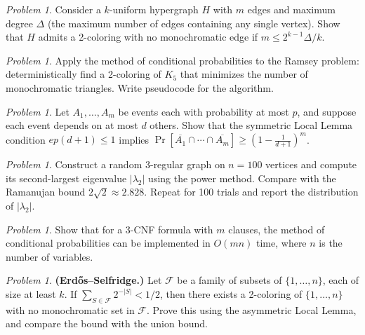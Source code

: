 \documentclass[twoside,12pt]{book}
\theoremstyle{plain}
\theoremstyle{definition}
\theoremstyle{remark}
\newtheorem{problem}[theorem]{Problem}
\begin{document}
\begin{problem}
Consider a $k$-uniform hypergraph $H$ with $m$ edges and maximum degree
$\Delta$ (the maximum number of edges containing any single vertex). Show
that $H$ admits a 2-coloring with no monochromatic edge if $m \leq
2^{k-1} \Delta / k$.
\end{problem}

\begin{problem}
Apply the method of conditional probabilities to the Ramsey problem:
deterministically find a 2-coloring of $K_5$ that minimizes the number
of monochromatic triangles. Write pseudocode for the algorithm.
\end{problem}

\begin{problem}
Let $A_1, \ldots, A_m$ be events each with probability at most $p$, and
suppose each event depends on at most $d$ others. Show that the symmetric
Local Lemma condition $ep(d+1) \leq 1$ implies
$\Pr[\overline{A_1} \cap \cdots \cap \overline{A_m}] \geq
\left(1 - \frac{1}{d+1}\right)^m$.
\end{problem}

\begin{problem}
Construct a random $3$-regular graph on $n = 100$ vertices and compute
its second-largest eigenvalue $|\lambda_2|$ using the power method.
Compare with the Ramanujan bound $2\sqrt{2} \approx 2.828$. Repeat for
100 trials and report the distribution of $|\lambda_2|$.
\end{problem}

\begin{problem}
Show that for a 3-CNF formula with $m$ clauses, the method of conditional
probabilities can be implemented in $O(mn)$ time, where $n$ is the number
of variables.
\end{problem}

\begin{problem}
\textbf{(Erd\H{o}s--Selfridge.)} Let $\mathcal{F}$ be a family of subsets
of $\{1, \ldots, n\}$, each of size at least $k$. If $\sum_{S \in
\mathcal{F}} 2^{-|S|} < 1/2$, then there exists a 2-coloring of
$\{1, \ldots, n\}$ with no monochromatic set in $\mathcal{F}$. Prove this
using the asymmetric Local Lemma, and compare the bound with the union
bound.
\end{problem}
\end{document}
